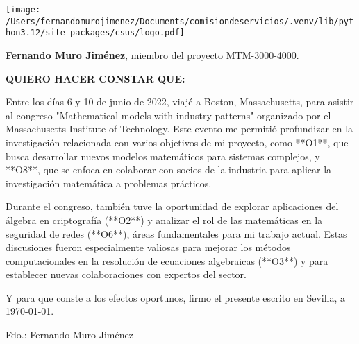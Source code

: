 \documentclass{memoir}
\begin{document}
\texttt{[image:  /Users/fernandomurojimenez/Documents/comisiondeservicios/.venv/lib/python3.12/site-packages/csus/logo.pdf]}
\begin{vplace}[.5]
\vspace{1cm}
\textbf{Fernando Muro Jiménez}, miembro del proyecto MTM-3000-4000.

\vspace{1cm}

\textbf{QUIERO HACER CONSTAR QUE:}

\vspace{1cm}

Entre los días 6 y 10 de junio de 2022, viajé a Boston, Massachusetts, para asistir al congreso "Mathematical models with industry patterns" organizado por el Massachusetts Institute of Technology. Este evento me permitió profundizar en la investigación relacionada con varios objetivos de mi proyecto, como **O1**, que busca desarrollar nuevos modelos matemáticos para sistemas complejos, y **O8**, que se enfoca en colaborar con socios de la industria para aplicar la investigación matemática a problemas prácticos.

Durante el congreso, también tuve la oportunidad de explorar aplicaciones del álgebra en criptografía (**O2**) y analizar el rol de las matemáticas en la seguridad de redes (**O6**), áreas fundamentales para mi trabajo actual. Estas discusiones fueron especialmente valiosas para mejorar los métodos computacionales en la resolución de ecuaciones algebraicas (**O3**) y para establecer nuevas colaboraciones con expertos del sector. 

\vspace{1cm}

Y para que conste a los efectos oportunos, firmo el presente escrito en Sevilla, a \today.

\vspace{3cm}

\begin{flushright}
    Fdo.: Fernando Muro Jiménez 
\end{flushright}
\end{vplace}
\end{document}
